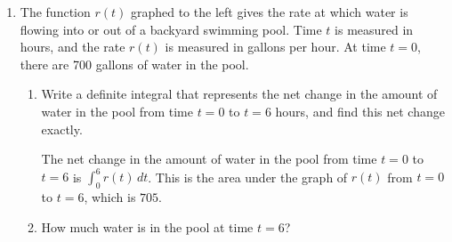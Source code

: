 \documentclass[main]{subfiles}
\begin{document}
\begin{enumerate}[resume]
\begin{enumerate}

  \end{enumerate}

\item 
  \hspace{0.1in}
  \begin{minipage}[t]{\linewidth-2.6in-15pt}
    \vspace{0pt} The function $r(t)$ graphed to the left gives the rate at
    which water is flowing into or out of a backyard swimming pool. Time
    $t$ is measured in hours, and the rate $r(t)$ is measured in gallons
    per hour.  At time $t=0$, there are 700 gallons of water in the pool.
  \end{minipage}

  \begin{enumerate}
  \item
    \begin{problem}[0.3in]
      Write a definite integral that represents the net change in the
      amount of water in the pool from time $t=0$ to $t=6$ hours, and find
      this net change exactly.  
    \end{problem}

    \begin{solution}
      The net change in the amount of water in the pool from time $t=0$ to
      $t=6$ is $\boxed{ \int_0^6 r(t)\,dt}$.  This is the area under the
      graph of $r(t)$ from $t = 0$ to $t = 6$, which is $\boxed{705}$.
    \end{solution} 

  \item
    \begin{problem}
      How much water is in the pool at time $t=6$?
    \end{problem}


\end{enumerate}
\end{enumerate}
\end{document}
